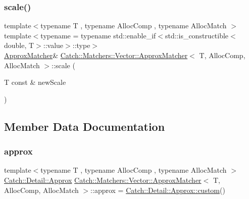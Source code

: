 \mbox{\label{struct_catch_1_1_matchers_1_1_vector_1_1_approx_matcher_a6856447aebfb7c4fe6b792900fb68f45}} 
\subsubsection{\texorpdfstring{scale()}{scale()}}
{\footnotesize\ttfamily template$<$typename T , typename Alloc\+Comp , typename Alloc\+Match $>$ \\
template$<$typename  = typename std\+::enable\+\_\+if$<$std\+::is\+\_\+constructible$<$double, T$>$\+::value$>$\+::type$>$ \\
\mbox{\hyperlink{struct_catch_1_1_matchers_1_1_vector_1_1_approx_matcher}{Approx\+Matcher}}\& \mbox{\hyperlink{struct_catch_1_1_matchers_1_1_vector_1_1_approx_matcher}{Catch\+::\+Matchers\+::\+Vector\+::\+Approx\+Matcher}}$<$ T, Alloc\+Comp, Alloc\+Match $>$\+::scale (\begin{DoxyParamCaption}\item[{T const \&}]{new\+Scale }\end{DoxyParamCaption})\hspace{0.3cm}{\ttfamily [inline]}}



\subsection{Member Data Documentation}
\mbox{\label{struct_catch_1_1_matchers_1_1_vector_1_1_approx_matcher_a0da9e77e66822ed7fd0164fc42420fa5}} 
\subsubsection{\texorpdfstring{approx}{approx}}
{\footnotesize\ttfamily template$<$typename T , typename Alloc\+Comp , typename Alloc\+Match $>$ \\
\mbox{\hyperlink{class_catch_1_1_detail_1_1_approx}{Catch\+::\+Detail\+::\+Approx}} \mbox{\hyperlink{struct_catch_1_1_matchers_1_1_vector_1_1_approx_matcher}{Catch\+::\+Matchers\+::\+Vector\+::\+Approx\+Matcher}}$<$ T, Alloc\+Comp, Alloc\+Match $>$\+::approx = \mbox{\hyperlink{class_catch_1_1_detail_1_1_approx_aaf86dc0ee92272ac2d9839197a07951d}{Catch\+::\+Detail\+::\+Approx\+::custom}}()\hspace{0.3cm}{\ttfamily [mutable]}}

